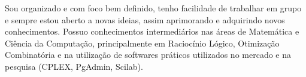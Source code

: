 

\begin{cvparagraph}
	{Sou organizado e com foco bem definido, tenho facilidade de trabalhar em grupo e sempre estou aberto a novas ideias, assim aprimorando e adquirindo novos conhecimentos. Possuo conhecimentos intermediários nas áreas de Matemática e Ciência da Computação, principalmente em Raciocínio Lógico, Otimização Combinatória e na utilização de softwares práticos utilizados no mercado e na pesquisa (CPLEX, PgAdmin, Scilab).}
\end{cvparagraph}

